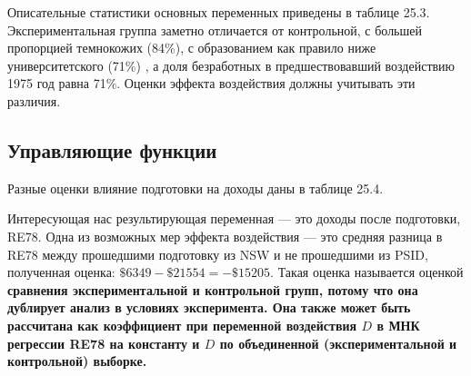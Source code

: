 Описательные статистики основных переменных приведены в таблице 25.3. Экспериментальная группа заметно отличается от контрольной, с большей пропорцией темнокожих (84\%), с образованием как правило ниже университетского (71\%) , а доля безработных в предшествовавший воздействию 1975 год равна 71\%. Оценки эффекта воздействия должны учитывать эти различия. 

\subsection{Управляющие функции}

Разные оценки влияние подготовки на доходы даны в таблице 25.4. 

Интересующая нас результирующая переменная --- это доходы после подготовки, RE78. Одна из возможных мер эффекта воздействия --- это средняя разница в RE78 между прошедшими подготовку из NSW и не прошедшими из PSID, полученная оценка: $\$ 6 349 - \$ 21 554 = - \$ 15 205$. Такая оценка называется оценкой \bfseries сравнения экспериментальной и контрольной групп, \mdseries потому что она дублирует анализ в условиях эксперимента. Она также может быть рассчитана как коэффициент при переменной воздействия $D$ в МНК регрессии RE78 на константу и $D$ по объединенной (экспериментальной и контрольной) выборке. 

